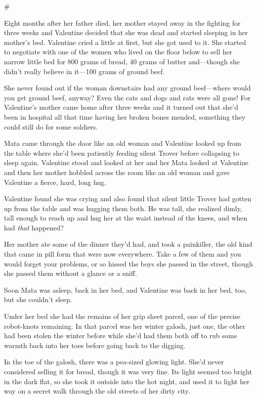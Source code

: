 \#

Eight months after her father died, her mother stayed away in the
fighting for three weeks and Valentine decided that she was dead
and started sleeping in her mother’s bed. Valentine cried a little
at first, but she got used to it. She started to negotiate with one
of the women who lived on the floor below to sell her narrow little
bed for 800 grams of bread, 40 grams of butter and—though she
didn’t really believe in it—100 grams of ground beef.

She never found out if the woman downstairs had any ground
beef—where would you get ground beef, anyway? Even the cats and
dogs and rats were all gone! For Valentine’s mother came home after
three weeks and it turned out that she’d been in hospital all that
time having her broken bones mended, something they could still do
for some soldiers.

Mata came through the door like an old woman and Valentine looked
up from the table where she’d been patiently feeding silent Trover
before collapsing to sleep again. Valentine stood and looked at her
and her Mata looked at Valentine and then her mother hobbled across
the room like an old woman and gave Valentine a fierce, hard, long
hug.

Valentine found she was crying and also found that silent little
Trover had gotten up from the table and was hugging them both. He
was tall, she realized dimly, tall enough to reach up and hug her
at the waist instead of the knees, and when had \emph{that}
happened?

Her mother ate some of the dinner they’d had, and took a
painkiller, the old kind that came in pill form that were now
everywhere. Take a few of them and you would forget your problems,
or so hissed the boys she passed in the street, though she passed
them without a glance or a sniff.

Soon Mata was asleep, back in her bed, and Valentine was back in
her bed, too, but she couldn’t sleep.

Under her bed she had the remains of her grip sheet parcel, one of
the precise robot-knots remaining. In that parcel was her winter
galosh, just one, the other had been stolen the winter before while
she’d had them both off to rub some warmth back into her toes
before going back to the digging.

In the toe of the galosh, there was a pea-sized glowing light.
She’d never considered selling it for bread, though it was very
fine. Its light seemed too bright in the dark flat, so she took it
outside into the hot night, and used it to light her way on a
secret walk through the old streets of her dirty city.

